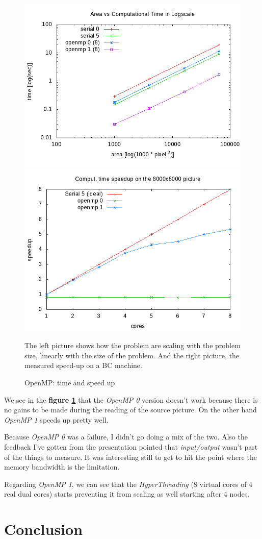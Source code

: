 \documentclass[10pt,a4paper]{article}
\begin{document}
\begin{figure}[ht]
    \begin{center}
        \includegraphics[width=.45\linewidth]{../../plots/areatime_compute_log_omp.png}
        \includegraphics[width=.45\linewidth]{../../plots/omp_speedup_compute_8000.png}
    \end{center}
    \caption{OpenMP: time and speed up}{The left picture shows how the problem
    are scaling with the problem size, linearly with the size of the problem.
    And the right picture, the measured speed-up on a BC machine.}
    \label{fig:omp}
\end{figure}

We see in the \textbf{figure \ref{fig:omp}} that the \emph{OpenMP 0} version
doesn't work because there is no gains to be made during the reading of the
source picture. On the other hand \emph{OpenMP 1} speeds up pretty well.

Because \emph{OpenMP 0} was a failure, I didn't go doing a mix of the two. Also
the feedback I've gotten from the presentation pointed that \emph{input/output}
wasn't part of the things to measure. It was interesting still to get to hit the
point where the memory bandwidth is the limitation.

Regarding \emph{OpenMP 1}, we can see that the \emph{HyperThreading} (8 virtual
cores of 4 real dual cores) starts preventing it from scaling as well starting
after 4 nodes.


\section{Conclusion}
\end{document}

